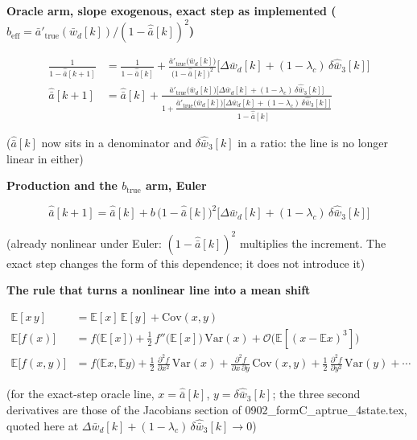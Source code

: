 \documentclass[11pt,a4paper,fontset=none]{ctexart}
\newcommand{\ba}{\bar{a}}
\newcommand{\bw}{\bar{w}}
\newcommand{\E}{\mathbb{E}}
\begin{document}
\textbf{Oracle arm, slope exogenous, exact step as implemented
($b_{\mathrm{eff}} = \ba'_{\mathrm{true}}(\bw_d[k])/(1-\hat{\ba}[k])^{2}$)}

\begin{align*}
\frac{1}{1-\hat{\ba}[k+1]}
  &= \frac{1}{1-\hat{\ba}[k]}
   + \frac{\ba'_{\mathrm{true}}\bigl(\bw_d[k]\bigr)}{\bigl(1-\hat{\ba}[k]\bigr)^{2}}
     \bigl[\Delta\bw_d[k] + (1-\lambda_c)\,\delta\hat{\bw}_3[k]\bigr] \\
\hat{\ba}[k+1]
  &= \hat{\ba}[k]
   + \frac{\ba'_{\mathrm{true}}\bigl(\bw_d[k]\bigr)
           \bigl[\Delta\bw_d[k] + (1-\lambda_c)\,\delta\hat{\bw}_3[k]\bigr]}
          {1 + \dfrac{\ba'_{\mathrm{true}}\bigl(\bw_d[k]\bigr)
           \bigl[\Delta\bw_d[k] + (1-\lambda_c)\,\delta\hat{\bw}_3[k]\bigr]}
          {1-\hat{\ba}[k]}}
\end{align*}

($\hat{\ba}[k]$ now sits in a denominator and $\delta\hat{\bw}_3[k]$ in a
ratio: the line is no longer linear in either)

\textbf{Production and the $b_{\mathrm{true}}$ arm, Euler}

\begin{equation*}
\hat{\ba}[k+1] = \hat{\ba}[k]
  + b\,\bigl(1-\hat{\ba}[k]\bigr)^{2}
    \bigl[\Delta\bw_d[k] + (1-\lambda_c)\,\delta\hat{\bw}_3[k]\bigr]
\end{equation*}

(already nonlinear under Euler: $(1-\hat{\ba}[k])^{2}$ multiplies the
increment. The exact step changes the form of this dependence; it does not
introduce it)

\textbf{The rule that turns a nonlinear line into a mean shift}

\begin{align*}
\E[x\,y] &= \E[x]\,\E[y] + \mathrm{Cov}(x,y) \\
\E\bigl[f(x)\bigr] &= f\bigl(\E[x]\bigr) + \tfrac{1}{2}\,f''\bigl(\E[x]\bigr)\,\mathrm{Var}(x)
  + \mathcal{O}\bigl(\E[(x-\E x)^{3}]\bigr) \\
\E\bigl[f(x,y)\bigr] &= f\bigl(\E x,\E y\bigr)
  + \tfrac{1}{2}\,\frac{\partial^{2}f}{\partial x^{2}}\,\mathrm{Var}(x)
  + \frac{\partial^{2}f}{\partial x\,\partial y}\,\mathrm{Cov}(x,y)
  + \tfrac{1}{2}\,\frac{\partial^{2}f}{\partial y^{2}}\,\mathrm{Var}(y)
  + \cdots
\end{align*}

(for the exact-step oracle line, $x = \hat{\ba}[k]$, $y = \delta\hat{\bw}_3[k]$;
the three second derivatives are those of the Jacobians section of
0902\_formC\_aptrue\_4state.tex, quoted here at
$\Delta\bw_d[k] + (1-\lambda_c)\,\delta\hat{\bw}_3[k] \to 0$)
\end{document}
